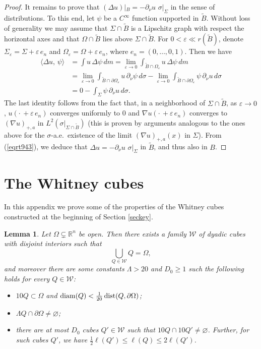 \documentclass[11pt]{amsart}
\newcommand{\R}{{\mathbb R}}       %
\newcommand{\WW}{{\mathcal W}}
\newcommand{\diam}{{\rm diam}}
\newcommand{\dist}{{\rm dist}}
\newcommand{\rf}[1]{{(\ref{#1})}}
\newcommand{\ve}{{\varepsilon}}
\newcommand{\vv}{{\vspace{2mm}}}
\newcommand{\wt}[1]{{\widetilde{#1}}}
\newtheorem{lemma}[theorem]{Lemma}
\theoremstyle{definition}
\theoremstyle{remark}
\numberwithin{equation}{section}
\begin{document}
\begin{proof}
It remains to prove that $(\Delta u)|_B = -\partial_\nu u\,\,\sigma|_\Sigma$ in the sense of distributions. To this end, let $\psi$ be a $C^\infty$ function supported in $\wt B$.
Without loss of generality we may assume that $\Sigma\cap \wt B$ is a Lipschitz graph with respect the horizontal axes and that $\Omega\cap \wt B$ lies above $\Sigma\cap\wt B$. For $0<\ve\ll r(\wt B)$, denote $\Sigma_\ve = \Sigma + \ve\,e_n$
and $\Omega_\ve = \Omega + \ve\,e_n$,
where $e_n=(0,\ldots,0,1)$. Then we have
\begin{align}\label{eqrt943}
\langle \Delta u,\,\psi\rangle &= \int u\,\Delta\psi\,dm  = \lim_{\ve\to 0} \int_{\wt B \cap\Omega_\ve} u\,\Delta\psi\,dm \\
& = \lim_{\ve\to 0} \int_{\wt B \cap\partial \Omega_\ve} u\,\partial_\nu\psi\,d\sigma
- \lim_{\ve\to 0} \int_{\wt B \cap\partial \Omega_\ve} \psi\,\partial_\nu u\,d\sigma\nonumber\\
& = 0 -  \int_{\Sigma} \psi\,\partial_\nu u\,d\sigma.\nonumber
\end{align}
The last identity follows from the fact that, in a neighborhood of $\Sigma\cap \wt B$, as $\ve\to0$, $u(\cdot\, +\ve\,e_n)$ converges 
uniformly to $0$ and $\nabla u(\cdot \,+ \ve\,e_n)$ converges  to $(\nabla u)_{+,a}$
in $L^2(\sigma|_{\Sigma\cap \wt B})$ (this is proven by arguments analogous to the ones above for the $\sigma$-a.e.\ existence of the limit $(\nabla u)_{+,a}(x)$ in $\Sigma$). From \rf{eqrt943}, we deduce that $\Delta u = -\partial_\nu u\,\,\sigma|_\Sigma$ in $\wt B$, and thus also in $B$.
\end{proof}


\vv

\section{The Whitney cubes}

In this appendix we prove some of the properties of the Whitney cubes constructed at the
beginning of Section \ref{seckey}.

\begin{lemma}\label{lem-whitney}
Let $\Omega\subsetneq\R^n$ be open. Then there exists a family $\WW$ 
of dyadic cubes with disjoint interiors such that
$$\bigcup_{Q\in\WW} Q = \Omega,$$
and moreover there are
 some constants $\Lambda>20$ and $D_0\geq1$ such the following holds for every $Q\in\WW$:
\begin{itemize}
\item[(i)] $10Q \subset \Omega$ and $\diam(Q)< \frac1{20}\,\dist(Q,\partial\Omega)$;
\item[(ii)] $\Lambda Q \cap \partial\Omega \neq \varnothing$;
\item[(iii)] there are at most $D_0$ cubes $Q'\in\WW$
such that $10Q \cap 10Q' \neq \varnothing$. Further, for such cubes $Q'$, we have $\frac12\ell(Q')\leq \ell(Q)\leq 2\ell(Q')$.
\end{itemize}
\end{lemma}
\end{document}
